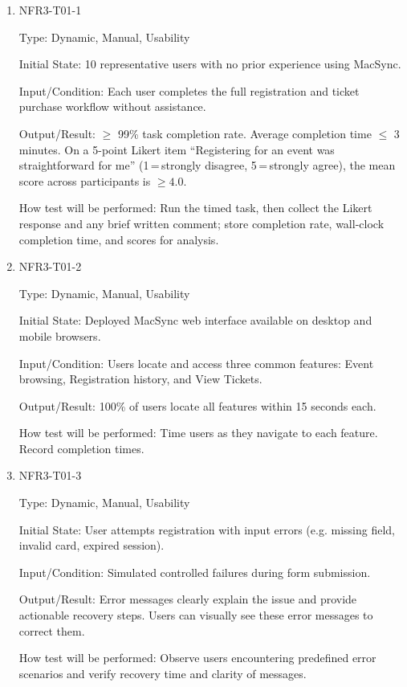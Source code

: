 \documentclass[12pt, titlepage]{article}
\begin{document}
\begin{enumerate}
\item{NFR3-T01-1\\}

Type: Dynamic, Manual, Usability

Initial State: 10 representative users with no prior experience using MacSync.

Input/Condition: Each user completes the full registration and ticket purchase workflow without assistance.

Output/Result: $\geq$ 99\% task completion rate. Average completion time $\leq$ 3 minutes. On a 5-point Likert item ``Registering for an event was straightforward for me'' (1\,=\,strongly disagree, 5\,=\,strongly agree), the mean score across participants is $\geq 4.0$.

How test will be performed: Run the timed task, then collect the Likert response and any brief written comment; store completion rate, wall-clock completion time, and scores for analysis.

\item{NFR3-T01-2\\}

Type: Dynamic, Manual, Usability

Initial State: Deployed MacSync web interface available on desktop and mobile browsers.

Input/Condition: Users locate and access three common features: Event browsing, Registration history, and View Tickets.

Output/Result: 100\% of users locate all features within 15 seconds each.

How test will be performed: Time users as they navigate to each feature. Record completion times.


\item{NFR3-T01-3\\}

Type: Dynamic, Manual, Usability

Initial State: User attempts registration with input errors (e.g. missing field, invalid card, expired session).

Input/Condition: Simulated controlled failures during form submission.

Output/Result: Error messages clearly explain the issue and provide actionable recovery steps. Users can visually see these error messages to correct them.

How test will be performed: Observe users encountering predefined error scenarios and verify recovery time and clarity of messages.
\end{enumerate}
\end{document}
